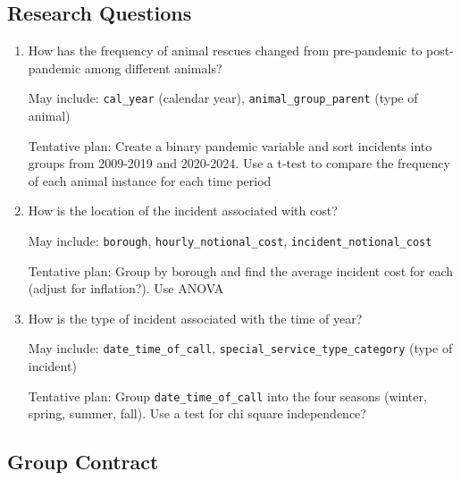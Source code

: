 \documentclass[
  letterpaper,
  DIV=11,
  numbers=noendperiod]{scrartcl}
\begin{document}
\hypertarget{research-questions}{%
\subsection{Research Questions}\label{research-questions}}

\begin{enumerate}
\def\labelenumi{\arabic{enumi}.}
\item
  How has the frequency of animal rescues changed from pre-pandemic to
  post-pandemic among different animals?

  May include: \texttt{cal\_year} (calendar year),
  \texttt{animal\_group\_parent} (type of animal)

  Tentative plan: Create a binary pandemic variable and sort incidents
  into groups from 2009-2019 and 2020-2024. Use a t-test to compare the
  frequency of each animal instance for each time period
\item
  How is the location of the incident associated with cost?

  May include: \texttt{borough}, \texttt{hourly\_notional\_cost},
  \texttt{incident\_notional\_cost}

  Tentative plan: Group by borough and find the average incident cost
  for each (adjust for inflation?). Use ANOVA
\item
  How is the type of incident associated with the time of year?

  May include: \texttt{date\_time\_of\_call},
  \texttt{special\_service\_type\_category} (type of incident)

  Tentative plan: Group \texttt{date\_time\_of\_call} into the four
  seasons (winter, spring, summer, fall). Use a test for chi square
  independence?
\end{enumerate}

\hypertarget{group-contract}{%
\subsection{Group Contract}\label{group-contract}}
\end{document}

